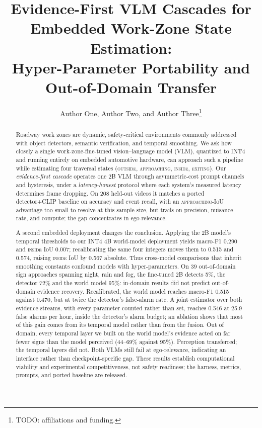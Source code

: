 \documentclass[journal]{IEEEtran}
\begin{document}
\title{Evidence-First VLM Cascades for Embedded Work-Zone State Estimation:\\Hyper-Parameter Portability and Out-of-Domain Transfer}

\author{Author One, Author Two, and Author Three\thanks{TODO: affiliations and funding.}}
\maketitle

\begin{abstract}
Roadway work zones are dynamic, safety-critical environments commonly addressed with object detectors, semantic verification, and temporal smoothing.  We ask how closely a single work-zone-fine-tuned vision--language model (VLM), quantized to INT4 and running entirely on embedded automotive hardware, can approach such a pipeline while estimating four traversal states (\textsc{outside}, \textsc{approaching}, \textsc{inside}, \textsc{exiting}).  Our \emph{evidence-first cascade} operates one 2B VLM through asymmetric-cost prompt channels and hysteresis, under a \emph{latency-honest} protocol where each system's measured latency determines frame dropping.  On 208 held-out videos it matches a ported detector+CLIP baseline on accuracy and event recall, with an \textsc{approaching}-IoU advantage too small to resolve at this sample size, but trails on precision, nuisance rate, and compute; the gap concentrates in ego-relevance.

A second embedded deployment changes the conclusion.  Applying the 2B model's temporal thresholds to our INT4 4B world-model deployment yields macro-F1 0.290 and \textsc{inside} IoU 0.007; recalibrating the same four integers moves them to 0.515 and 0.574, raising \textsc{inside} IoU by 0.567 absolute.  Thus cross-model comparisons that inherit smoothing constants confound models with hyper-parameters.  On 39 out-of-domain sign approaches spanning night, rain and fog, the fine-tuned 2B detects 5\%, the detector 72\% and the world model 95\%: in-domain results did not predict out-of-domain evidence recovery.  Recalibrated, the world model reaches macro-F1 0.515 against 0.470, but at twice the detector's false-alarm rate.  A joint estimator over both evidence streams, with every parameter counted rather than set, reaches 0.546 at 25.9 false alarms per hour, inside the detector's alarm budget; an ablation shows that most of this gain comes from its temporal model rather than from the fusion.  Out of domain, every temporal layer we built on the world model's evidence acted on far fewer signs than the model perceived (44--69\% against 95\%).  Perception transferred; the temporal layers did not.  Both VLMs still fail at ego-relevance, indicating an interface rather than checkpoint-specific gap.  These results establish computational viability and experimental competitiveness, not safety readiness; the harness, metrics, prompts, and ported baseline are released.
\end{abstract}
\end{document}
